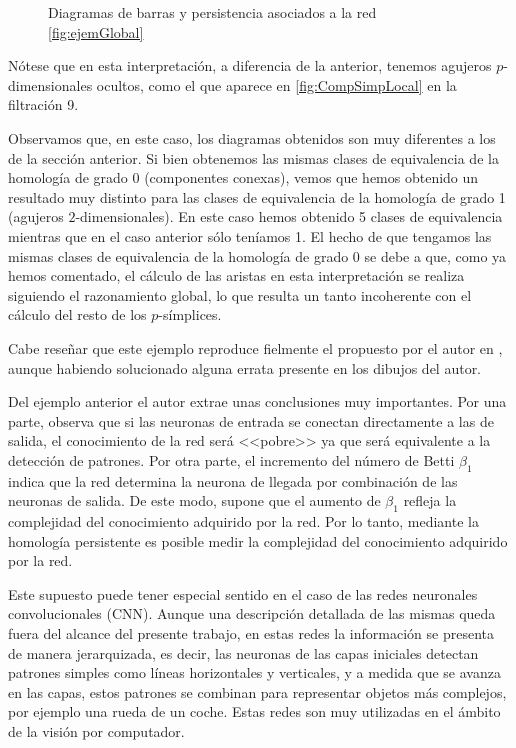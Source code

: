 \documentclass[12pt, a4paper, twoside]{book}
\numberwithin{equation}{section}
\theoremstyle{definition}
\newenvironment{ejem}
  {\pushQED{\qed}\renewcommand{\qedsymbol}{$\blacktriangleleft$}\ejemplo}
  {\popQED\endejemplo}
\theoremstyle{remark}
\theoremstyle{plain}
\begin{document}
\begin{ejem}
\begin{figure}[H]
\begin{figure}[H]
			\end{figure}
		\endminipage
		\caption{Diagramas de barras y persistencia asociados a la red 
		\ref{fig:ejemGlobal}}
	\end{figure}
	
	Nótese que en esta interpretación, a diferencia de la anterior, 
	tenemos agujeros $p$-dimensionales ocultos, como el que aparece en 
	\ref{fig:CompSimpLocal} en la filtración 9.

	Observamos que, en este caso, los diagramas obtenidos son muy 
	diferentes a los de la sección anterior. Si bien obtenemos las mismas 
	clases de equivalencia de la homología de grado 0 (componentes 
	conexas), vemos que hemos obtenido un resultado muy distinto para las
	clases de equivalencia de la homología de grado 1 (agujeros 
	$2$-dimensionales). En este caso hemos obtenido 5 clases de 
	equivalencia mientras que en el caso anterior sólo teníamos 1. El 
	hecho de que tengamos las mismas clases de equivalencia de la 
	homología de grado 0 se debe a que, como ya hemos comentado, el 
	cálculo de las aristas en esta interpretación se realiza siguiendo el
	razonamiento global, lo que resulta un tanto incoherente con el 
	cálculo del resto de los $p$-símplices. 

	Cabe reseñar que este ejemplo reproduce fielmente el propuesto por el 
	autor en \cite{Articulo-Watanabe}, aunque habiendo solucionado alguna 
	errata presente en los dibujos del autor.

	\end{ejem}

	Del ejemplo anterior el autor extrae unas conclusiones muy 
	importantes. Por una parte, observa que si las neuronas de entrada se 
	conectan directamente a las de salida, el conocimiento de la red será 
	<<pobre>> ya que será equivalente a la detección de patrones. Por otra 
	parte, el incremento del número de Betti $\beta_{1}$ indica que la red 
	determina la neurona de llegada por combinación de las neuronas de 
	salida. De este modo, supone que el aumento de $\beta_{1}$ refleja la 
	complejidad del conocimiento adquirido por la red. Por lo tanto, 
	mediante la homología persistente es posible medir la complejidad del 
	conocimiento adquirido por la red.

	Este supuesto puede tener especial sentido en el caso de las redes 
	neuronales convolucionales (CNN). Aunque una descripción detallada de 
	las mismas queda fuera del alcance del presente trabajo, en estas 
	redes la información se presenta de manera jerarquizada, es decir, las
	neuronas de las capas iniciales detectan patrones simples como líneas
	horizontales y verticales, y a medida que se avanza en las capas, 
	estos patrones se combinan para representar objetos más complejos, por 
	ejemplo una rueda de un coche. Estas redes son muy utilizadas en el 
	ámbito de la visión por computador.
\end{document}
